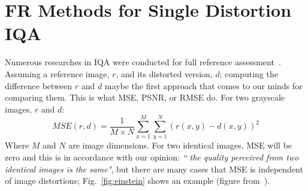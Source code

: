 \section{FR Methods for Single Distortion IQA}
Numerous researches in IQA were conducted for full reference assessment~\cite{lin2010perceptual}. Assuming a reference image, $r$, and its distorted version, $d$; computing the difference between $r$ and $d$ maybe the first approach that comes to our minds for comparing them. This is what MSE, PSNR, or RMSE do. For two grayscale images, $r$ and $d$:
\begin{equation}
    MSE(r, d) = \frac{1}{M\times N}\sum_{x=1}^M\sum_{y=1}^N(r(x, y)-d(x, y))^2
    \label{eq:mse}
\end{equation}
Where $M$ and $N$ are image dimensions. For two identical images, MSE will be zero and this is in accordance with our opinion: \emph{`` the quality perceived from two identical images is the same"}, but there are many cases that MSE is independent of image distortions; Fig.~\ref{fig:einstein} shows an example (figure from~\cite{Wang2004}).
